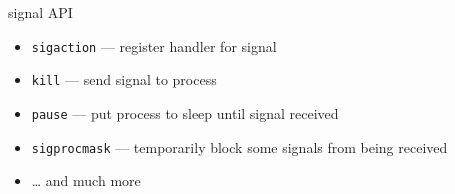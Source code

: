 
\begin{frame}{signal API}
\begin{itemize}
    \item {\tt sigaction} --- register handler for signal
    \item {\tt kill} --- send signal to process
    \item {\tt pause} --- put process to sleep until signal received
    \item {\tt sigprocmask} --- temporarily block some signals from being received
    \item \ldots{} and much more
\end{itemize}
\end{frame}
